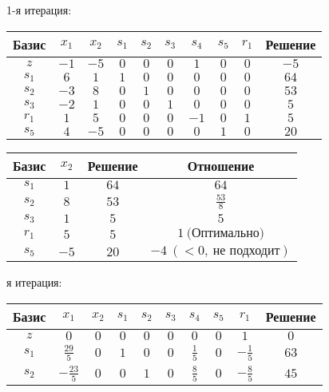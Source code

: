\documentclass{article}%
\begin{document}
\begin{flushleft}%
1{-}я итерация: %
\newline%
\newline%
\renewcommand{\arraystretch}{1.3}%
\begin{tabular}{|c|cccccccc|c|}%
\hline%
Базис&$x_{1}$&$x_{2}$&$s_{1}$&$s_{2}$&$s_{3}$&$s_{4}$&$s_{5}$&$r_{1}$&Решение\\%
\hline%
$z$&$-1$&$-5$&$0$&$0$&$0$&$1$&$0$&$0$&$-5$\\%
\hline%
$s_{1}$&$6$&$1$&$1$&$0$&$0$&$0$&$0$&$0$&$64$\\%
$s_{2}$&$-3$&$8$&$0$&$1$&$0$&$0$&$0$&$0$&$53$\\%
$s_{3}$&$-2$&$1$&$0$&$0$&$1$&$0$&$0$&$0$&$5$\\%
$r_{1}$&$1$&$5$&$0$&$0$&$0$&$-1$&$0$&$1$&$5$\\%
$s_{5}$&$4$&$-5$&$0$&$0$&$0$&$0$&$1$&$0$&$20$\\%
\hline%
\end{tabular}%
\newline%
\newline%
\newline%
\begin{tabular}{|cccc|}%
\hline%
Базис&$x_{2}$&Решение&Отношение\\%
\hline%
$s_{1}$&$1$&$64$&$64$\\%
$s_{2}$&$8$&$53$&$\frac{53}{8}$\\%
$s_{3}$&$1$&$5$&$5$\\%
$r_{1}$&$5$&$5$&$1\: \text{(Оптимально)}$\\%
$s_{5}$&$-5$&$20$&$-4\: (< 0, \: \text{не подходит})$\\%
\hline%
\end{tabular}%
\newline%
\newline%
я итерация: %
\newline%
\newline%
\renewcommand{\arraystretch}{1.3}%
\begin{tabular}{|c|cccccccc|c|}%
\hline%
Базис&$x_{1}$&$x_{2}$&$s_{1}$&$s_{2}$&$s_{3}$&$s_{4}$&$s_{5}$&$r_{1}$&Решение\\%
\hline%
$z$&$0$&$0$&$0$&$0$&$0$&$0$&$0$&$1$&$0$\\%
\hline%
$s_{1}$&$\frac{29}{5}$&$0$&$1$&$0$&$0$&$\frac{1}{5}$&$0$&$-\frac{1}{5}$&$63$\\%
$s_{2}$&$-\frac{23}{5}$&$0$&$0$&$1$&$0$&$\frac{8}{5}$&$0$&$-\frac{8}{5}$&$45$\\%

\end{tabular}
\end{flushleft}
\end{document}
